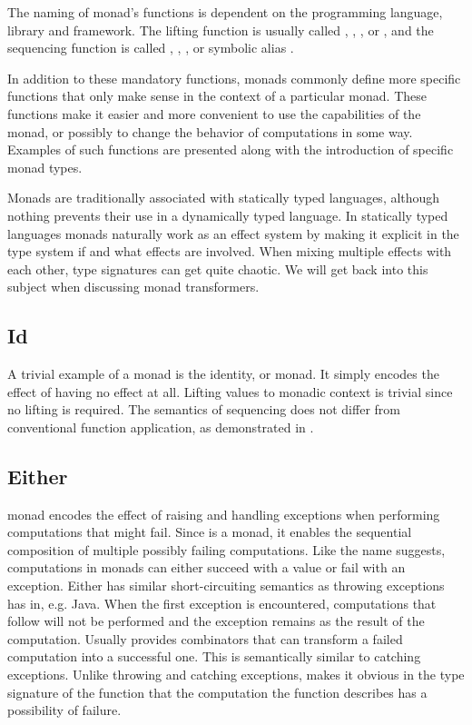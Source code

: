 

The naming of monad's functions is dependent on the programming language, library and framework. The lifting function is usually called , , , or , and the sequencing function is called , , , or symbolic alias \inlinecode{>>=}.

In addition to these mandatory functions, monads commonly define more specific functions that only make sense in the context of a particular monad. These functions make it easier and more convenient to use the capabilities of the monad, or possibly to change the behavior of computations in some way. Examples of such functions are presented along with the introduction of specific monad types.

Monads are traditionally associated with statically typed languages, although nothing prevents their use in a dynamically typed language. In statically typed languages monads naturally work as an effect system by making it explicit in the type system if and what effects are involved. When mixing multiple effects with each other, type signatures can get quite chaotic. We will get back into this subject when discussing monad transformers.


\subsection{Id}
A trivial example of a monad is the identity, or  monad. It simply encodes the effect of having no effect at all.   Lifting values to monadic context is trivial since no lifting is required. The semantics of sequencing does not differ from conventional function application, as demonstrated in .




\subsection{Either} \label{monads:either}
 monad encodes the effect of raising and handling exceptions when performing computations that might fail. Since  is a monad, it enables the sequential composition of multiple possibly failing computations. Like the name suggests, computations in  monads can either succeed with a value or fail with an exception. Either has similar short-circuiting semantics as throwing exceptions has in, e.g. Java. When the first exception is encountered, computations that follow will not be performed and the exception remains as the result of the computation. Usually  provides combinators that can transform a failed computation into a successful one. This is semantically similar to catching exceptions. Unlike throwing and catching exceptions,  makes it obvious in the type signature of the function that the computation the function describes has a possibility of failure.

